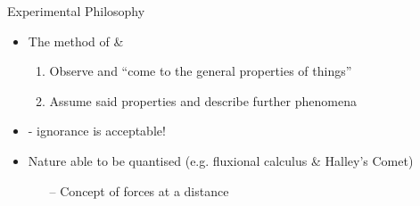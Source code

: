 \documentclass{beamer}
\begin{document}
\begin{frame}{Experimental Philosophy}
	\begin{itemize}
		\item The method of {\color{mEm}{resolution}} \& {\color{mEm}{composition:}}
			\begin{enumerate}
				\item Observe and ``come to the general properties of things''{\only\autocite{newtonprinc}}
				\item Assume said properties and describe further phenomena
			\end{enumerate}
		\item {\color{mEm}{Hypotheses non fingo}}\autocite{principia} - ignorance is acceptable!
		\item Nature able to be quantised (e.g. fluxional calculus \& Halley's Comet)
			\begin{itemize}
				\item[--] Concept of forces at a distance
			\end{itemize}
	\end{itemize}
\end{frame}
\end{document}
